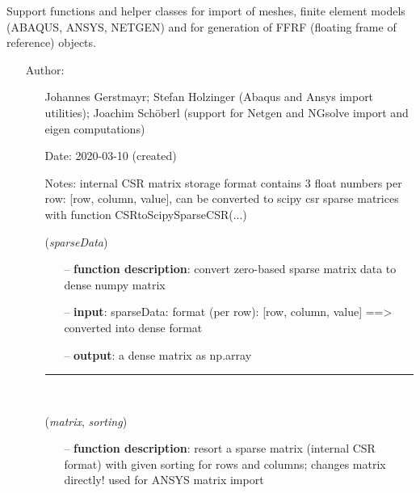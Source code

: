 \begin{itemize}[leftmargin=1.4cm]
\begin{itemize}[leftmargin=1.4cm]
\begin{itemize}[leftmargin=0.5cm]
\begin{itemize}[leftmargin=1.4cm]
%
\label{sec:module:FEM}
  Support functions and helper classes for import of meshes, finite element models (ABAQUS, ANSYS, NETGEN) and for generation of FFRF (floating frame of reference) objects.
\begin{itemize}[leftmargin=1.4cm]
\setlength{\itemindent}{-1.4cm}
\item[]Author:
\vspace{-22pt}\begin{itemize}[leftmargin=0.5cm]
\setlength{\itemindent}{-0.5cm}
\item[]   Johannes Gerstmayr; Stefan Holzinger (Abaqus and Ansys import utilities); Joachim Sch\"oberl (support for Netgen and NGsolve \cite{Schoeberl1997,NGsolve2014,NGsolve2022} import and eigen computations)
\ei
\item[]Date:      2020-03-10 (created)
\item[]Notes:  	internal CSR matrix storage format contains 3 float numbers per row: [row, column, value], can be converted to scipy csr sparse matrices with function CSRtoScipySparseCSR(...)
\ei
\begin{flushleft}
\label{sec:FEM:CompressedRowSparseToDenseMatrix}
({\it sparseData})
\end{flushleft}
\setlength{\itemindent}{0.7cm}
\begin{itemize}[leftmargin=0.7cm]
  \item[--]  {\bf function description}: convert zero-based sparse matrix data to dense numpy matrix  \item[--]  {\bf input}: sparseData: format (per row): [row, column, value] ==> converted into dense format  \item[--]  {\bf output}: a dense matrix as np.array\vspace{12pt}\end{itemize}
%
\noindent\rule{8cm}{0.75pt}\vspace{1pt} \\ 
\begin{flushleft}
\label{sec:FEM:MapSparseMatrixIndices}
({\it matrix}, {\it sorting})
\end{flushleft}
\setlength{\itemindent}{0.7cm}
\begin{itemize}[leftmargin=0.7cm]
  \item[--]  {\bf function description}: resort a sparse matrix (internal CSR format) with given sorting for rows and columns; changes matrix directly! used for ANSYS matrix import\vspace{12pt}\end{itemize}

\end{itemize}
\end{itemize}
\end{itemize}
\end{itemize}
\end{itemize}
\end{itemize}
